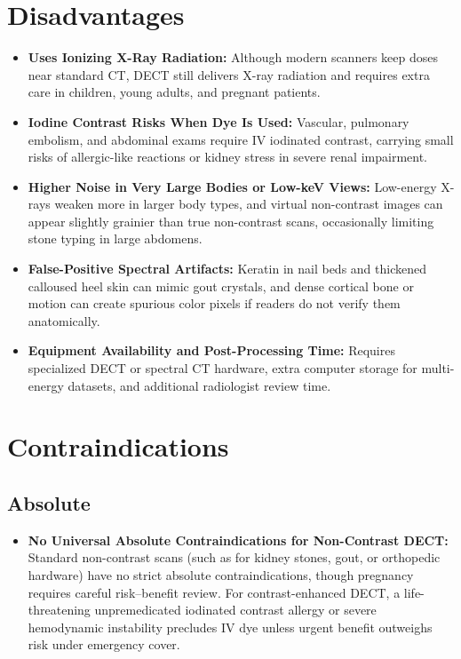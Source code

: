 \section{Disadvantages}
\begin{itemize}
\item \textbf{Uses Ionizing X-Ray Radiation:} Although modern scanners keep doses near standard CT, DECT still delivers X-ray radiation and requires extra care in children, young adults, and pregnant patients.
\item \textbf{Iodine Contrast Risks When Dye Is Used:} Vascular, pulmonary embolism, and abdominal exams require IV iodinated contrast, carrying small risks of allergic-like reactions or kidney stress in severe renal impairment.
\item \textbf{Higher Noise in Very Large Bodies or Low-keV Views:} Low-energy X-rays weaken more in larger body types, and virtual non-contrast images can appear slightly grainier than true non-contrast scans, occasionally limiting stone typing in large abdomens.
\item \textbf{False-Positive Spectral Artifacts:} Keratin in nail beds and thickened calloused heel skin can mimic gout crystals, and dense cortical bone or motion can create spurious color pixels if readers do not verify them anatomically.
\item \textbf{Equipment Availability and Post-Processing Time:} Requires specialized DECT or spectral CT hardware, extra computer storage for multi-energy datasets, and additional radiologist review time.
\end{itemize}

\section{Contraindications}

\subsection{Absolute}
\begin{itemize}
\item \textbf{No Universal Absolute Contraindications for Non-Contrast DECT:} Standard non-contrast scans (such as for kidney stones, gout, or orthopedic hardware) have no strict absolute contraindications, though pregnancy requires careful risk--benefit review. For contrast-enhanced DECT, a life-threatening unpremedicated iodinated contrast allergy or severe hemodynamic instability precludes IV dye unless urgent benefit outweighs risk under emergency cover.
\end{itemize}

